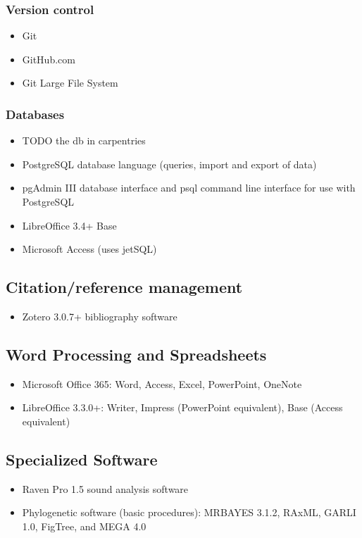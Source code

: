 \documentclass[
  letterpaper,
  DIV=11,
  numbers=noendperiod,
  oneside]{scrreprt}
\providecommand{\tightlist}{%
  \setlength{\itemsep}{0pt}\setlength{\parskip}{0pt}}\usepackage{longtable,booktabs,array}
\begin{document}
\subsubsection{Version control}\label{version-control}

\begin{itemize}
\tightlist
\item
  Git
\item
  GitHub.com
\item
  Git Large File System
\end{itemize}

\subsubsection{Databases}\label{databases}

\begin{itemize}
\tightlist
\item
  TODO the db in carpentries
\item
  PostgreSQL database language (queries, import and export of data)
\item
  pgAdmin III database interface and psql command line interface for use
  with PostgreSQL
\item
  LibreOffice 3.4+ Base
\item
  Microsoft Access (uses jetSQL)
\end{itemize}

\subsection{Citation/reference
management}\label{citationreference-management}

\begin{itemize}
\tightlist
\item
  Zotero 3.0.7+ bibliography software
\end{itemize}

\subsection{Word Processing and
Spreadsheets}\label{word-processing-and-spreadsheets}

\begin{itemize}
\tightlist
\item
  Microsoft Office 365: Word, Access, Excel, PowerPoint, OneNote
\item
  LibreOffice 3.3.0+: Writer, Impress (PowerPoint equivalent), Base
  (Access equivalent)
\end{itemize}

\subsection{Specialized Software}\label{specialized-software}

\begin{itemize}
\tightlist
\item
  Raven Pro 1.5 sound analysis software
\item
  Phylogenetic software (basic procedures): MRBAYES 3.1.2, RAxML, GARLI
  1.0, FigTree, and MEGA 4.0
\end{itemize}
\end{document}
